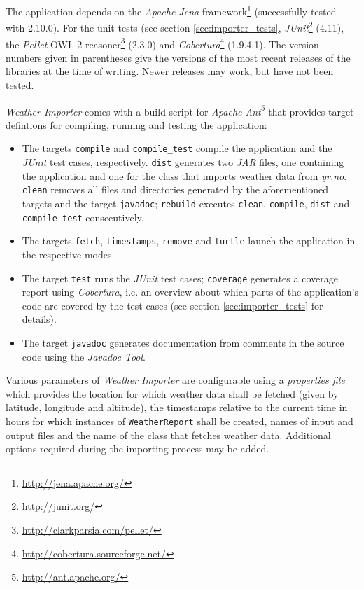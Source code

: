 The application depends on the \emph{Apache Jena} framework\footnote{\href{http://jena.apache.org/}{http://jena.apache.org/}} (successfully tested with 2.10.0). For the unit tests (see section \ref{sec:importer_tests}, \emph{JUnit}\footnote{\href{http://junit.org/}{http://junit.org/}} (4.11), the \emph{Pellet} OWL 2 reasoner\footnote{\href{http://clarkparsia.com/pellet/}{http://clarkparsia.com/pellet/}} (2.3.0) and \emph{Cobertura}\footnote{\href{http://cobertura.sourceforge.net/}{http://cobertura.sourceforge.net/}} (1.9.4.1). The version numbers given in parentheses give the versions of the most recent releases of the libraries at the time of writing. Newer releases may work, but have not been tested.

\emph{Weather Importer} comes with a build script for \emph{Apache Ant}\footnote{\href{http://ant.apache.org/}{http://ant.apache.org/}} that provides target defintions for compiling, running and testing the application:

\begin{itemize}
  \item The targets \texttt{compile} and \texttt{compile\_test} compile the application and the \emph{JUnit} test cases, respectively. \texttt{dist} generates two \emph{JAR} files, one containing the application and one for the class that imports weather data from \emph{yr.no}. \texttt{clean} removes all files and directories generated by the aforementioned targets and the target \texttt{javadoc}; \texttt{rebuild} executes \texttt{clean}, \texttt{compile}, \texttt{dist} and \texttt{compile\_test} consecutively.
  \item The targets \texttt{fetch}, \texttt{timestamps}, \texttt{remove} and \texttt{turtle} launch the application in the respective modes.
  \item The target \texttt{test} runs the \emph{JUnit} test cases; \texttt{coverage} generates a coverage report using \emph{Cobertura}, i.e. an overview about which parts of the application's code are covered by the test cases (see section \ref{sec:importer_tests} for details).
  \item The target \texttt{javadoc} generates documentation from comments in the source code using the \emph{Javadoc Tool}.
\end{itemize}

Various parameters of \emph{Weather Importer} are configurable using a \emph{properties file} which provides the location for which weather data shall be fetched (given by latitude, longitude and altitude), the timestamps relative to the current time in hours for which instances of \texttt{WeatherReport} shall be created, names of input and output files and the name of the class that fetches weather data. Additional options required during the importing process may be added.

